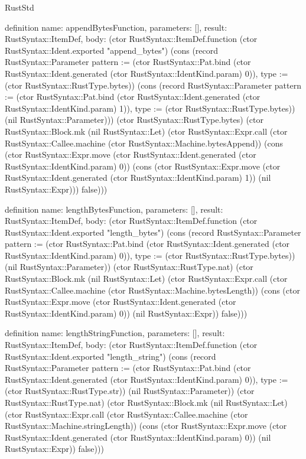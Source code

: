 \begin{lexlean}{RustStd}
\begin{semanticmodule}
definition{
  name: appendBytesFunction,
  parameters: [],
  result: RustSyntax::ItemDef,
  body: (ctor RustSyntax::ItemDef.function (ctor RustSyntax::Ident.exported "append_bytes") (cons (record RustSyntax::Parameter {pattern := (ctor RustSyntax::Pat.bind (ctor RustSyntax::Ident.generated (ctor RustSyntax::IdentKind.param) 0)), type := (ctor RustSyntax::RustType.bytes)}) (cons (record RustSyntax::Parameter {pattern := (ctor RustSyntax::Pat.bind (ctor RustSyntax::Ident.generated (ctor RustSyntax::IdentKind.param) 1)), type := (ctor RustSyntax::RustType.bytes)}) (nil RustSyntax::Parameter))) (ctor RustSyntax::RustType.bytes) (ctor RustSyntax::Block.mk (nil RustSyntax::Let) (ctor RustSyntax::Expr.call (ctor RustSyntax::Callee.machine (ctor RustSyntax::Machine.bytesAppend)) (cons (ctor RustSyntax::Expr.move (ctor RustSyntax::Ident.generated (ctor RustSyntax::IdentKind.param) 0)) (cons (ctor RustSyntax::Expr.move (ctor RustSyntax::Ident.generated (ctor RustSyntax::IdentKind.param) 1)) (nil RustSyntax::Expr))) false)))
}

definition{
  name: lengthBytesFunction,
  parameters: [],
  result: RustSyntax::ItemDef,
  body: (ctor RustSyntax::ItemDef.function (ctor RustSyntax::Ident.exported "length_bytes") (cons (record RustSyntax::Parameter {pattern := (ctor RustSyntax::Pat.bind (ctor RustSyntax::Ident.generated (ctor RustSyntax::IdentKind.param) 0)), type := (ctor RustSyntax::RustType.bytes)}) (nil RustSyntax::Parameter)) (ctor RustSyntax::RustType.nat) (ctor RustSyntax::Block.mk (nil RustSyntax::Let) (ctor RustSyntax::Expr.call (ctor RustSyntax::Callee.machine (ctor RustSyntax::Machine.bytesLength)) (cons (ctor RustSyntax::Expr.move (ctor RustSyntax::Ident.generated (ctor RustSyntax::IdentKind.param) 0)) (nil RustSyntax::Expr)) false)))
}

definition{
  name: lengthStringFunction,
  parameters: [],
  result: RustSyntax::ItemDef,
  body: (ctor RustSyntax::ItemDef.function (ctor RustSyntax::Ident.exported "length_string") (cons (record RustSyntax::Parameter {pattern := (ctor RustSyntax::Pat.bind (ctor RustSyntax::Ident.generated (ctor RustSyntax::IdentKind.param) 0)), type := (ctor RustSyntax::RustType.str)}) (nil RustSyntax::Parameter)) (ctor RustSyntax::RustType.nat) (ctor RustSyntax::Block.mk (nil RustSyntax::Let) (ctor RustSyntax::Expr.call (ctor RustSyntax::Callee.machine (ctor RustSyntax::Machine.stringLength)) (cons (ctor RustSyntax::Expr.move (ctor RustSyntax::Ident.generated (ctor RustSyntax::IdentKind.param) 0)) (nil RustSyntax::Expr)) false)))
}


\end{semanticmodule}
\end{lexlean}
